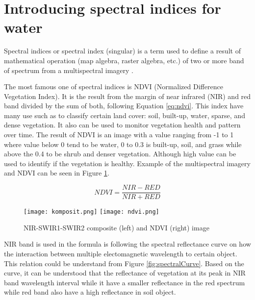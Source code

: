 \maketitle

\tableofcontents

\section{Introducing spectral indices for water}
Spectral indices or spectral index (singular) is a term used to define a result of mathematical operation (map algebra, raster algebra, etc.) of two or more band of spectrum from a multispectral imagery \cite{xue2017significant}.

 The most famous one of spectral indices is NDVI (Normalized Difference Vegetation Index). It is the result from the margin of near infrared (NIR) and red band divided by the sum of both, following Equation \ref{eq:ndvi}. This index have many use such as to classify certain land cover: soil, built-up, water, sparse, and dense vegetation. It also can be used to monitor vegetation health and pattern over time. The result of NDVI is an image with a value ranging from -1 to 1 where value below 0 tend to be water, 0 to 0.3 is built-up, soil, and grass while above the 0.4 to be shrub and denser vegetation. Although high value can be used to identify if the vegetation is healthy. Example of the multispectral imagery and NDVI can be seen in Figure \ref{fig:imageNdvi}.

\begin{equation}
	\label{eq:ndvi}
	NDVI = \frac{NIR - RED}{NIR + RED}
\end{equation}

\begin{figure}[htbp]
	\label{fig:imageNdvi}
	\centering
	\texttt{[image: komposit.png]}
	\texttt{[image: ndvi.png]}
	\caption{NIR-SWIR1-SWIR2 composite (left) and NDVI (right) image}
\end{figure}

NIR band is used in the formula is following the spectral reflectance curve on how the interaction between multiple electomagnetic wavelength to certain object. This relation could be understand from Figure \ref{fig:spectralCurve}. Based on the curve, it can be understood that the reflectance of vegetation at its peak in NIR band wavelength interval while it have a smaller reflectance in the red spectrum while red band also have a high reflectance in soil object.

